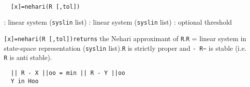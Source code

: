 \begin{mandesc}
   \\ %
\end{mandesc}
\begin{calling_sequence}
\begin{verbatim}
  [x]=nehari(R [,tol])  
\end{verbatim}
\end{calling_sequence}
\begin{parameters}
  \begin{varlist}
    : linear system (\verb!syslin! list)
    : linear system (\verb!syslin! list)
    : optional threshold
  \end{varlist}
\end{parameters}
\begin{mandescription}
  \verb![x]=nehari(R [,tol])returns! the Nehari approximant of \verb!R!.\verb!R!
  = linear system in state-space representation (\verb!syslin! list).\verb!R! is
  strictly proper and \verb!- R~! is stable (i.e. \verb!R! is anti stable).
\begin{verbatim}
  || R - X ||oo = min || R - Y ||oo
  Y in Hoo
\end{verbatim}
\end{mandescription}

